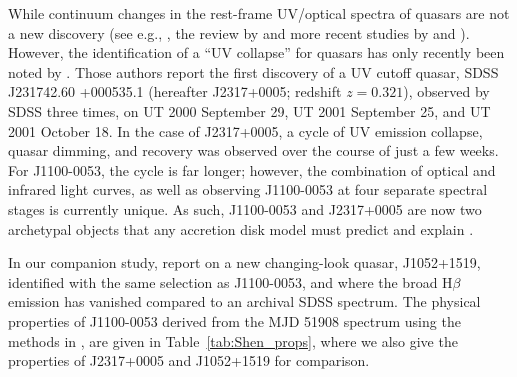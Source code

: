 \documentclass[a4paper,fleqn,usenatbib]{mnras}
\begin{document}
While continuum changes in the rest-frame UV/optical spectra of
quasars are not a new discovery (see e.g., \citealt{Clavel1991}, the
review by \citealt{Ulrich1997} and more recent studies by
\citealt{VandenBerk2004, Pereyra2006, MacLeod2010} and
\citealt{Guo2016b}). However, the identification of a ``UV collapse''
for quasars has only recently been noted by \cite{Guo2016}.  Those
authors report the first discovery of a UV cutoff quasar, SDSS
J231742.60 +000535.1 (hereafter J2317+0005; redshift $z = 0.321$),
observed by SDSS three times, on UT 2000 September 29, UT 2001
September 25, and UT 2001 October 18. In the case of J2317+0005, a
cycle of UV emission collapse, quasar dimming, and recovery was
observed over the course of just a few weeks. For J1100-0053, the
cycle is far longer; however, the combination of optical and infrared
light curves, as well as observing J1100-0053 at four separate
spectral stages is currently unique. As such, J1100-0053 and
J2317+0005 are now two archetypal objects that any accretion disk
model must predict and explain \citep[e.g.,][]{Lawrence2018}.

In our companion study, \citet{Stern2018} report on a new
changing-look quasar, J1052+1519, identified with the same selection
as J1100-0053, and where the broad H$\beta$ emission has vanished
compared to an archival SDSS spectrum. The physical properties of
J1100-0053 derived from the MJD 51908 spectrum using the methods in
\citet{Shen2011}, are given in Table~\ref{tab:Shen_props}, where we
also give the properties of J2317+0005 \citep{Guo2016} and J1052+1519
\citep{Stern2018} for comparison.
\end{document}
